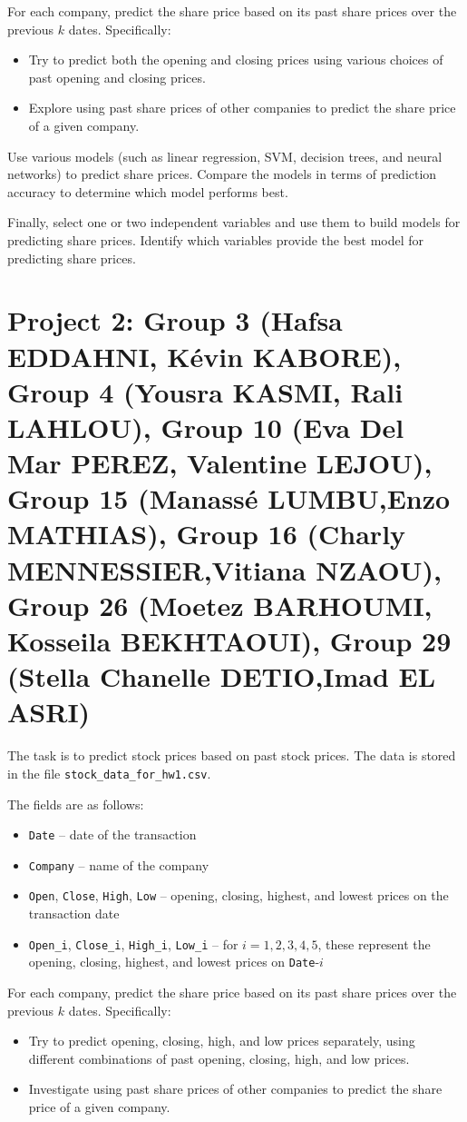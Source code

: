 \documentclass{article}
\begin{document}
For each company, predict the share price based on its past share prices over the previous $k$ dates. Specifically: 
\begin{itemize} 
\item Try to predict both the opening and closing prices using various choices of past opening and closing prices. 
\item Explore using past share prices of other companies to predict the share price of a given company. 
\end{itemize}

Use various models (such as linear regression, SVM, decision trees, and neural networks) to predict share prices. Compare the models in terms of prediction accuracy to determine which model performs best.

Finally, select one or two independent variables and use them to build models for predicting share prices. Identify which variables provide the best model for predicting share prices.



\section*{Project 2:  Group 3 (Hafsa	EDDAHNI,
Kévin	KABORE), Group 4 (Yousra	KASMI,
Rali	LAHLOU),  Group 10 (Eva Del Mar	PEREZ,
Valentine	LEJOU), Group 15 (Manassé	LUMBU,Enzo	MATHIAS),
Group 16 (Charly	MENNESSIER,Vitiana	NZAOU), Group 26 (Moetez	BARHOUMI,
Kosseila	BEKHTAOUI), Group 29 (Stella Chanelle	DETIO,Imad	EL ASRI)
}
The task is to predict stock prices based on past stock prices. The data is stored in the file \lstinline$stock_data_for_hw1.csv$.

The fields are as follows: \begin{itemize} \item \lstinline$Date$ -- date of the transaction \item \lstinline$Company$ -- name of the company \item \lstinline$Open$, \lstinline$Close$, \lstinline$High$, \lstinline$Low$ -- opening, closing, highest, and lowest prices on the transaction date \item \lstinline$Open_i$, \lstinline$Close_i$, \lstinline$High_i$, \lstinline$Low_i$ -- for $i=1,2,3,4,5$, these represent the opening, closing, highest, and lowest prices on \lstinline$Date$-$i$ \end{itemize}

For each company, predict the share price based on its past share prices over the previous $k$ dates. Specifically: \begin{itemize} \item Try to predict opening, closing, high, and low prices separately, using different combinations of past opening, closing, high, and low prices. \item Investigate using past share prices of other companies to predict the share price of a given company. \end{itemize}
\end{document}
